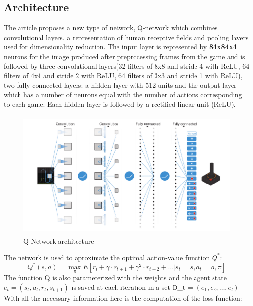 \subsection{Architecture}
The article\cite{nature} proposes a new type of network, Q-network which combines convolutional layers, a representation of human receptive fields and pooling layers used for dimensionality reduction. The input layer is represented by \textbf{84x84x4} neurons for the image produced after preprocessing frames from the game and is followed by three convolutional layers(32 filters of 8x8 and stride 4 with ReLU, 64 filters of 4x4 and stride 2 with ReLU, 64 filters of 3x3 and stride 1 with ReLU), two fully connected layers: a hidden layer with 512 units and the output layer which has a number of neurons equal with the number of actions corresponding to each game. Each hidden layer is followed by a rectified linear unit (ReLU).



\begin{figure}[h]
	\begin{center}
		\includegraphics[width=442px,height=242px]{src/img/state/schematic-ilustration}
		\caption{Q-Network architecture\cite{nature}} \label{fig:arch}
    \end{center}
\end{figure}

The network is used to aproximate the optimal action-value function $Q^{*}$\cite{nature}:
\begin{equation}
	Q^{*}(s,a) = \max_\pi E[r_t + \gamma\cdot r_{t+1} + \gamma^2\cdot r_{t+2} + \dotsc | s_t = s, a_t = a, \pi]
\end{equation}
The function Q is also parameterized with the weights and the agent state $e_t = (s_t,a_t,r_t,s_{t+1})$ is saved at each iteration in a set D_t = ${(e_1, e_2, \dotsc, e_t)}$
With all the necessary information here is the computation of the loss function\cite{nature}:

